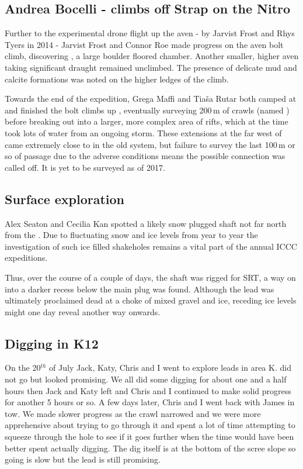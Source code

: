 \subsection{Andrea Bocelli - climbs off Strap on the Nitro}
Further to the experimental drone flight up the  aven - by Jarvist Frost and Rhys Tyers in 2014 - Jarvist Frost and Connor Roe made progress on the aven bolt climb, discovering , a large boulder floored chamber. Another smaller, higher aven taking significant draught remained unclimbed. The presence of delicate mud and calcite formations was noted on the higher ledges of the climb.

Towards the end of the expedition, Grega Maffi and Tia\v{s}a Rutar both camped at 
 and finished the bolt climbs up , eventually surveying 200\,m of crawls (named ) before breaking out into a larger, more complex area of rifts, which at the time took lots of water from an ongoing storm. These extensions at the far west of  came extremely close to  in the old system, but failure to survey the last 100\,m or so of passage due to the adverse conditions means the possible connection was called off. It is yet to be surveyed as of 2017.

\subsection{Surface exploration}
Alex Seaton and Cecilia Kan spotted a likely snow plugged shaft not far north from the . Due to fluctuating snow and ice levels from year to year the investigation of such ice filled shakeholes remains a vital part of the annual ICCC expeditions. 

Thus, over the course of a couple of days, the shaft was rigged for SRT, a way on into a darker recess below the main plug was found. Although the lead was ultimately proclaimed dead at a choke of mixed gravel and ice, receding ice levels might one day reveal another way onwards. 

\subsection{Digging in K12}

On the 20$^{th}$ of July Jack, Katy, Chris and I went to explore leads in area K.  did not go but  looked promising.  We all did some digging for about one and a half hours then Jack and Katy left and Chris and I continued to make solid progress for another 5 hours or so. A few days later, Chris and I went back with James in tow. We made slower progress as the crawl narrowed and we were more apprehensive about trying to go through it and spent a lot of time attempting to squeeze through the hole to see if it goes further when the time would have been better spent actually digging. The dig itself is at the bottom of the scree slope so going is slow but the lead is still promising. 

